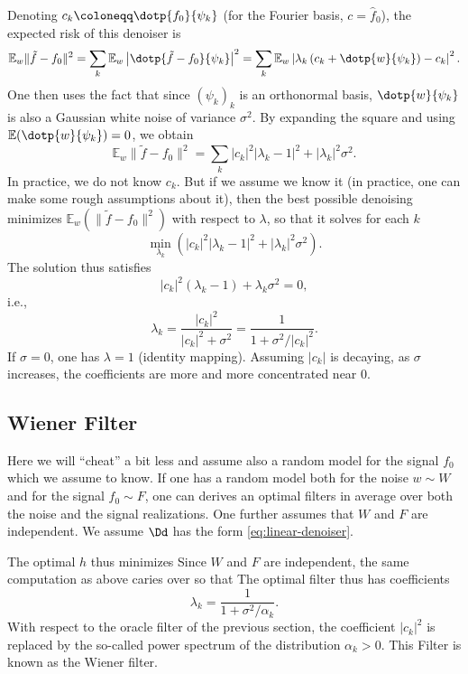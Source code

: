 Denoting $c_k \coloneqq \dotp{f_0}{\psi_k}$ (for the Fourier basis, $c=\hat f_0$), the expected risk of this denoiser is
$$
	\mathbb{E}_w \|\tilde{f} - f_0\|^2 = \sum_k \mathbb{E}_w \left| \dotp{\tilde{f} - f_0}{\psi_k} \right|^2  = \sum_k \mathbb{E}_w  \left| \lambda_k \left( c_k + \dotp{\noise}{\psi_k} \right) - c_k \right|^2 .
$$
One then uses the fact that since $(\psi_k)_k$ is an orthonormal basis, $\dotp{\noise}{\psi_k}$ is also a Gaussian white noise of variance $\sigma^2$. By expanding the square and using $\mathbb{E}(\dotp{\noise}{\psi_k}) = 0$, we obtain
$$
\mathbb{E}_w  \|\tilde{f} - f_0\|^2  = \sum_k  |c_k|^2 |\lambda_k - 1|^2 + |\lambda_k|^2 \sigma^2 .
$$
In practice, we do not know $c_k$. But if we assume we know it (in practice, one can make some rough assumptions about it), then the best possible denoising minimizes $\mathbb{E}_w \left( \|\tilde{f} - f_0\|^2 \right)$ with respect to $\lambda$, so that it solves for each $k$
$$
	\min_{\lambda_k} \left( |c_k|^2 |\lambda_k - 1|^2 + |\lambda_k|^2 \sigma^2 \right).
$$
The solution thus satisfies
$$
	|c_k|^2 (\lambda_k - 1) + \lambda_k \sigma^2 = 0,
$$
i.e.,
$$
	\lambda_k = \frac{|c_k|^2}{|c_k|^2 + \sigma^2} = \frac{1}{1 + \sigma^2 / |c_k|^2}.
$$
If $\sigma = 0$, one has $\lambda = 1$ (identity mapping). Assuming $|c_k|$ is decaying, as $\sigma$ increases, the coefficients are more and more concentrated near 0.



\subsection{Wiener Filter}

Here we will ``cheat'' a bit less and assume also a random model for the signal $f_0$ which we assume to know. 
%
If one has a random model both for the noise $w \sim W$ and for the signal $f_0 \sim F$, one can derives an optimal filters in average over both the noise and the signal realizations. One further assumes that $W$ and $F$ are independent.
%
We assume $\Dd$ has the form \eqref{eq:linear-denoiser}. 


The optimal $h$ thus minimizes
Since $W$ and $F$ are independent, the same computation as above caries over so that  
The optimal filter thus has coefficients
\begin{equation}\label{eq:wiener}
	\lambda_k = \frac{1}{1 + \sigma^2 / \alpha_k}.
\end{equation}
With respect to the oracle filter of the previous section, the coefficient $|c_k|^2$ is replaced by the so-called power spectrum of the distribution $\alpha_k>0$. 
%
This Filter is known as the Wiener filter. 


